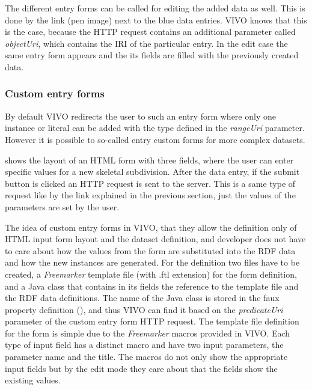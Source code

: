 The different entry forms can be called for editing the added data as well. This is done by the link (pen image) next to the blue data entries. VIVO knows that this is the case, because the HTTP request contains an additional parameter called \textit{objectUri}, which contains the IRI of the particular entry. In the edit case the same entry form appears and the its fields are filled with the previously created data.

\subsubsection{Custom entry forms} \label{vivoCef}

By default VIVO redirects the user to such an entry form where only one instance or literal can be added with the type defined in the \textit{rangeUri} parameter. However it is possible to so-called entry custom forms for more complex datasets.


 shows the layout of an HTML form with three fields, where the user can enter specific values for a new skeletal subdivision. After the data entry, if the submit button is clicked an HTTP request is sent to the server. This is a same type of request like by the link explained in the previous section, just the values of the parameters are set by the user.

The idea of custom entry forms in VIVO, that they allow the definition only of HTML input form layout and the dataset definition, and developer does not have to care about how the values from the form are substituted into the RDF data and how the new instances are generated. For the definition two files have to be created, a \textit{Freemarker}  template file (with .ftl extension) for the form definition, and a Java class that contains in its fields the reference to the template file and the RDF data definitions. The name of the Java class is stored in the faux property definition (), and thus VIVO can find it based on the \textit{predicateUri} parameter of the custom entry form HTTP request. The template file definition for the form is simple due to the \textit{Freemarker} macros provided in VIVO. Each type of input field has a distinct macro and have two input parameters, the parameter name and the title. The macros do not only show the appropriate input fields but by the edit mode they care about that the fields show the existing values.

